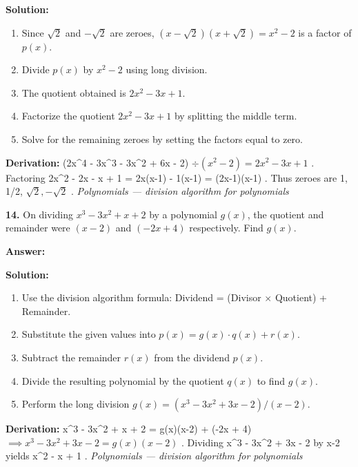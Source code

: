 \documentclass[12pt,a4paper]{exam}
\newcommand{\fitmath}[1]{%
  \sbox{\schmathbox}{$\displaystyle #1$}%
  \ifdim\wd\schmathbox>\linewidth
    \resizebox{\linewidth}{!}{\usebox{\schmathbox}}%
  \else
    \usebox{\schmathbox}%
  \fi}
\begin{document}
\begin{questions}
\textbf{Solution:}
\begin{enumerate}
  \item Since $\sqrt{2}$ and $-\sqrt{2}$ are zeroes, $(x - \sqrt{2})(x + \sqrt{2}) = x^2 - 2$ is a factor of $p(x)$.
  \item Divide $p(x)$ by $x^2 - 2$ using long division.
  \item The quotient obtained is $2x^2 - 3x + 1$.
  \item Factorize the quotient $2x^2 - 3x + 1$ by splitting the middle term.
  \item Solve for the remaining zeroes by setting the factors equal to zero.
\end{enumerate}
\textbf{Derivation:}
 (2x\textasciicircum{}4 - 3x\textasciicircum{}3 - 3x\textasciicircum{}2 + 6x - 2) $\div (x^2 - 2) = 2x^2 - 3x + 1$ . Factoring  2x\textasciicircum{}2 - 2x - x + 1 = 2x(x-1) - 1(x-1) = (2x-1)(x-1) . Thus zeroes are  1, 1/2, $\sqrt{2}, -\sqrt{2}$ .
\hfill \textit{Polynomials — division algorithm for polynomials}
\vspace{0.3cm}

\question \textbf{14.} On dividing $x^3 - 3x^2 + x + 2$ by a polynomial $g(x)$, the quotient and remainder were $(x - 2)$ and $(-2x + 4)$ respectively. Find $g(x)$.

\textbf{Answer:}
\begin{center}
\fitmath{g(x) = x^2 - x + 1}
\end{center}

\textbf{Solution:}
\begin{enumerate}
  \item Use the division algorithm formula: Dividend = (Divisor $\times$ Quotient) + Remainder.
  \item Substitute the given values into $p(x) = g(x) \cdot q(x) + r(x)$.
  \item Subtract the remainder $r(x)$ from the dividend $p(x)$.
  \item Divide the resulting polynomial by the quotient $q(x)$ to find $g(x)$.
  \item Perform the long division $g(x) = (x^3 - 3x^2 + 3x - 2) / (x - 2)$.
\end{enumerate}
\textbf{Derivation:}
 x\textasciicircum{}3 - 3x\textasciicircum{}2 + x + 2 = g(x)(x-2) + (-2x + 4) $\implies x^3 - 3x^2 + 3x - 2 = g(x)(x-2)$ . Dividing  x\textasciicircum{}3 - 3x\textasciicircum{}2 + 3x - 2  by  x-2  yields  x\textasciicircum{}2 - x + 1 .
\hfill \textit{Polynomials — division algorithm for polynomials}
\vspace{0.3cm}


\end{questions}
\end{document}
